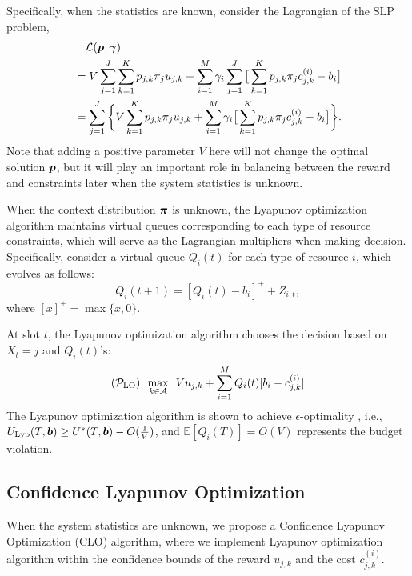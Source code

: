 Specifically, when the statistics are known, consider the Lagrangian of the SLP problem,
{\small 
\begin{align}
&\quad\mathcal{L}(\boldsymbol{p}, \boldsymbol{\gamma}) \nonumber \\
&= V \sum_{j= 1}^J \sum_{k = 1}^K p_{j,k} \pi_j u_{j,k} + \sum_{i=1}^M \gamma_i \sum_{j=1}^J \big[\sum_{k = 1}^K p_{j,k} \pi_j c_{j,k}^{(i)}  - b_i\big] \nonumber \\
&= \sum_{j=1}^J \bigg\{V \sum_{k = 1}^K p_{j,k} \pi_j u_{j,k}  + \sum_{i=1}^M \gamma_i \big[\sum_{k = 1}^K p_{j,k} \pi_j c_{j,k}^{(i)}  - b_i\big]    \bigg\}.
\end{align}
}Note that adding a positive parameter $V$ here will not change the optimal solution $\boldsymbol{p}$, but it will play an important role in balancing between the reward and constraints later when the system statistics is unknown.

When the context distribution $\boldsymbol{\pi}$ is unknown, the Lyapunov optimization algorithm maintains virtual queues corresponding to each type of resource constraints, which will serve as the Lagrangian multipliers when making decision. Specifically, consider a virtual queue $Q_i(t)$ for each type of resource $i$, which evolves as follows:
\begin{equation}
Q_i(t + 1) = [Q_i(t) - b_i]^+ + Z_{i,t},
\end{equation}
where $[x]^+ = \max\{x, 0\}$.


At slot $t$, the Lyapunov optimization algorithm chooses the decision based on $X_t = j$ and $Q_i(t)$'s:
\begin{equation}
(\mathcal{P}_{\rm LO})~~\underset{k\in \mathcal{A}}{\text{max}} ~~ V u_{j,k} + \sum_{i = 1}^M Q_i(t)[b_i - c_{j,k}^{(i)}] \nonumber
\end{equation}
The Lyapunov optimization algorithm is shown to achieve $\epsilon$-optimality \cite{Neely2010Book:BP}, i.e., $U_{\text{Lyp}}(T, \boldsymbol{b})\geq U^*(T, \boldsymbol{b})  - O(\frac{1}{V})$, and $\mathbb{E}[Q_i(T)] = O(V)$ represents the budget violation.

\subsection{Confidence Lyapunov Optimization}
When the system statistics are unknown, we propose a Confidence Lyapunov Optimization (CLO) algorithm, where we implement Lyapunov optimization algorithm within the confidence bounds of the reward $u_{j,k}$ and the cost $c_{j,k}^{(i)}$.

